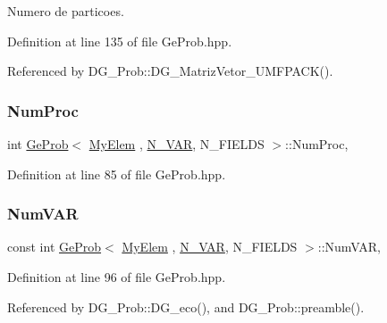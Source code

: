 Numero de particoes. 



Definition at line 135 of file Ge\+Prob.\+hpp.



Referenced by D\+G\+\_\+\+Prob\+::\+D\+G\+\_\+\+Matriz\+Vetor\+\_\+\+U\+M\+F\+P\+A\+C\+K().

\mbox{\label{classGeProb_a8678d8a8dc17175ba98761beeccc0e04}} 
\subsubsection{\texorpdfstring{Num\+Proc}{NumProc}}
{\footnotesize\ttfamily int \hyperlink{classGeProb}{Ge\+Prob}$<$ \hyperlink{DG__Prob_8h_a83cd887ced9a6587428f267e50cd4787}{My\+Elem} , \hyperlink{classED__Prob_a4e7d2ff1a8e435e336fb00c527224b5a}{N\+\_\+\+V\+AR}, N\+\_\+\+F\+I\+E\+L\+DS $>$\+::Num\+Proc\hspace{0.3cm}{\ttfamily [protected]}, {\ttfamily [inherited]}}



Definition at line 85 of file Ge\+Prob.\+hpp.

\mbox{\label{classGeProb_ac6d9c06150838e892ed3eaa1b60bac5d}} 
\subsubsection{\texorpdfstring{Num\+V\+AR}{NumVAR}}
{\footnotesize\ttfamily const int \hyperlink{classGeProb}{Ge\+Prob}$<$ \hyperlink{DG__Prob_8h_a83cd887ced9a6587428f267e50cd4787}{My\+Elem} , \hyperlink{classED__Prob_a4e7d2ff1a8e435e336fb00c527224b5a}{N\+\_\+\+V\+AR}, N\+\_\+\+F\+I\+E\+L\+DS $>$\+::Num\+V\+AR\hspace{0.3cm}{\ttfamily [protected]}, {\ttfamily [inherited]}}



Definition at line 96 of file Ge\+Prob.\+hpp.



Referenced by D\+G\+\_\+\+Prob\+::\+D\+G\+\_\+eco(), and D\+G\+\_\+\+Prob\+::preamble().

\mbox{\label{classGeProb_a2ac12ca16e62807fd3c69d97bf665336}} 
